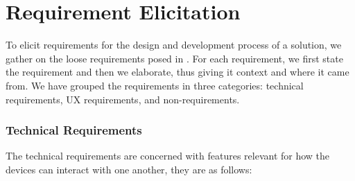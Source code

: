 \chapter{Requirement Elicitation}\label{cha:requirement_elicitation}
To elicit requirements for the design and development process of a solution, we gather on the loose requirements posed in .
For each requirement, we first state the requirement and then we elaborate, thus giving it context and where it came from.
We have grouped the requirements in three categories: technical requirements, \ac{UX} requirements, and non-requirements.

\subsection*{Technical Requirements}
The technical requirements are concerned with features relevant for how the devices can interact with one another, they are as follows:
